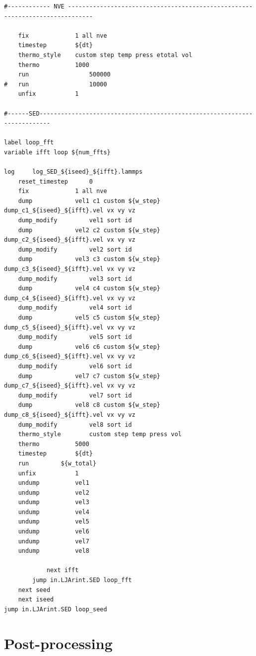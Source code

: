 \documentclass{article}
\begin{document}
\begin{verbatim}
#------------ NVE -----------------------------------------------------------------------------	

	fix 			1 all nve
	timestep		${dt}
	thermo_style  	custom step temp press etotal vol
	thermo			1000
	run             	500000	
#	run             	10000
	unfix 			1

#------SED-------------------------------------------------------------------------

label loop_fft
variable ifft loop ${num_ffts}

log 	log_SED_${iseed}_${ifft}.lammps
	reset_timestep  	0
	fix 			1 all nve
	dump 			vel1 c1 custom ${w_step} dump_c1_${iseed}_${ifft}.vel vx vy vz
	dump_modify 		vel1 sort id
	dump 			vel2 c2 custom ${w_step} dump_c2_${iseed}_${ifft}.vel vx vy vz
	dump_modify 		vel2 sort id
	dump 			vel3 c3 custom ${w_step} dump_c3_${iseed}_${ifft}.vel vx vy vz
	dump_modify 		vel3 sort id
	dump 			vel4 c4 custom ${w_step} dump_c4_${iseed}_${ifft}.vel vx vy vz
	dump_modify 		vel4 sort id
	dump 			vel5 c5 custom ${w_step} dump_c5_${iseed}_${ifft}.vel vx vy vz
	dump_modify 		vel5 sort id
	dump 			vel6 c6 custom ${w_step} dump_c6_${iseed}_${ifft}.vel vx vy vz
	dump_modify 		vel6 sort id
	dump 			vel7 c7 custom ${w_step} dump_c7_${iseed}_${ifft}.vel vx vy vz
	dump_modify 		vel7 sort id
	dump 			vel8 c8 custom ${w_step} dump_c8_${iseed}_${ifft}.vel vx vy vz
	dump_modify 		vel8 sort id
	thermo_style 		custom step temp press vol
	thermo			5000
	timestep		${dt}
	run			${w_total}
	unfix			1
	undump			vel1
	undump			vel2
	undump			vel3
	undump			vel4
	undump			vel5
	undump			vel6
	undump			vel7
	undump			vel8

			next ifft
		jump in.LJArint.SED loop_fft
	next seed
	next iseed
jump in.LJArint.SED loop_seed
\end{verbatim}

\section*{Post-processing}
\end{document}
